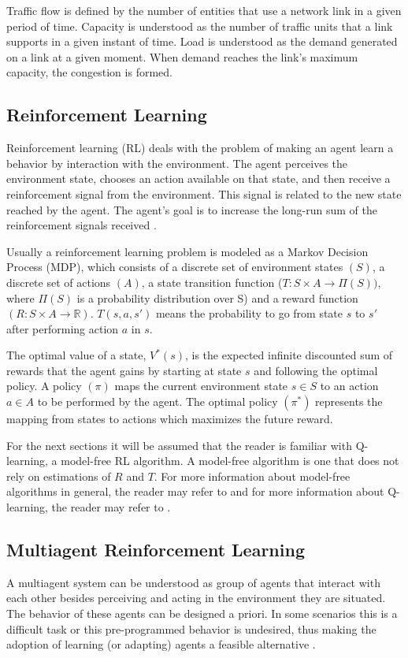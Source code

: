 \documentclass[12pt]{article}
\begin{document}
Traffic flow is defined by the number of entities that use a network link in a given period of time. Capacity is understood as the number of traffic units that a link supports in a given instant of time. Load is understood as the demand generated on a link at a given moment. When demand reaches the link's maximum capacity, the congestion is formed.

\subsection{Reinforcement Learning}

Reinforcement learning (RL) deals with the problem of making an agent learn a behavior by interaction with the environment. The agent perceives the environment state, chooses an action available on that state, and then receive a reinforcement signal from the environment. This signal is related to the new state reached by the agent. The agent's goal is to increase the long-run sum of the reinforcement signals received \cite{Kaelbling+1996}.

Usually a reinforcement learning problem is modeled as a Markov Decision Process (MDP), which consists of a discrete set of environment states $(S)$, a discrete set of actions $(A)$, a state transition function ($T: S \times A \to \Pi(S))$, where $\Pi(S)$ is a probability distribution over S) and a reward function $(R: S \times A \to \mathbb{R})$. $T(s, a, s')$ means the probability to go from state $s$ to $s'$ after performing action $a$ in $s$.

The optimal value of a state, $V^*(s)$, is the expected infinite discounted sum of rewards that the agent gains by starting at state $s$ and following the optimal policy. A policy $(\pi)$ maps the current environment state $s \in S$ to an action $a \in A$ to be performed by the agent. The optimal policy $(\pi^*)$ represents the mapping from states to actions which maximizes the future reward.

For the next sections it will be assumed that the reader is familiar with Q-learning, a model-free RL algorithm. A model-free algorithm is one that does not rely on estimations of $R$ and $T$. For more information about model-free algorithms in general, the reader may refer to \cite{Kaelbling+1996} and for more information about Q-learning, the reader may refer to  \cite{Watkins&Dayan1992}.

\subsection{Multiagent Reinforcement Learning}
A multiagent system can be understood as group of agents that interact with each other besides perceiving and acting in the environment they are situated. The behavior of these agents can be designed a priori. In some scenarios this is a difficult task or this pre-programmed behavior is undesired, thus making the adoption of learning (or adapting) agents a feasible alternative \cite{Busoniu+2008}.
\end{document}
